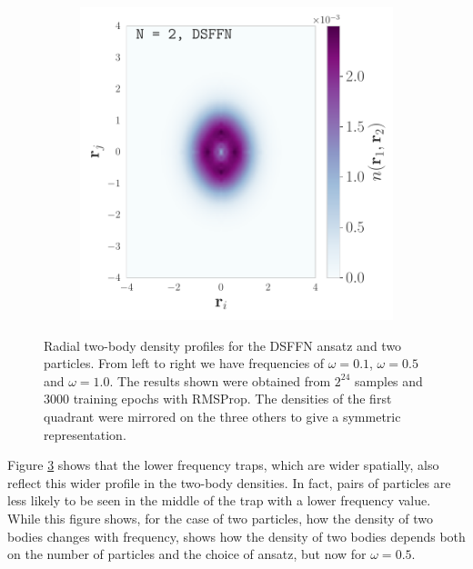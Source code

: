 \begin{figure}[H]
\begin{subfigure}[t]{0.32\textwidth}
        \label{fig:sub2}
    \end{subfigure}
    \begin{subfigure}[t]{0.32\textwidth}
        \centering
        \includegraphics[width=\textwidth]{Chapters/Results/dots/two_body_density_N[2]_nqs_DSFFN_1.0.pdf}
        \label{fig:sub3}
    \end{subfigure}
    \caption{Radial two-body density profiles for the DSFFN ansatz and two particles. From left to right we have frequencies of $\omega = 0.1$, $\omega = 0.5$ and $\omega = 1.0$. The results shown were obtained from $2^{24}$ samples and 3000 training epochs with RMSProp. The densities of the first quadrant were mirrored on the three others to give a symmetric representation.}
    \label{fig:2bdensity2particle}
\end{figure}


Figure \ref{fig:2bdensity2particle} shows that the lower frequency traps, which are wider spatially, also reflect this wider profile in the two-body densities. In fact, pairs of particles are less likely to be seen in the middle of the trap with a lower frequency value. While this figure shows, for the case of two particles, how the density of two bodies changes with frequency,  shows how the density of two bodies depends both on the number of particles and the choice of ansatz, but now for $\omega = 0.5$.

